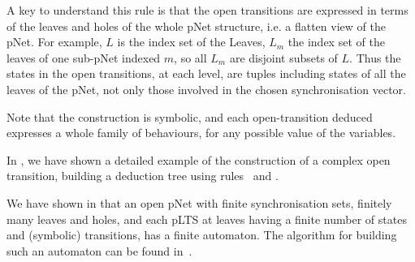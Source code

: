 \documentclass{lmcs}
\newcommand{\TODO}[1]{\textcolor{red}{\textbf{[TODO:#1]}}}
\begin{document}
        	A key to understand this rule is that the open transitions are
	expressed in terms of the leaves and holes of the whole pNet structure,
	i.e. a flatten view of the pNet. For example, $L$ is the index set of the
	Leaves, $L_m$ the index set of the leaves of one sub-pNet indexed $m$, so all $L_m$
	are disjoint subsets of $L$. Thus the states in the open transitions,
	at each level, are tuples including states of all the
	leaves of the pNet, not only those involved in the chosen
	synchronisation vector.


Note that  the construction is symbolic, and each open-transition deduced expresses a whole family of
behaviours, for any possible value of the variables.
%

In \cite{henrio:Forte2016}, we have shown a detailed example of the construction of a complex open transition, building a deduction tree using rules \TrUn ~and \TrDeux.



We have shown in \cite{henrio:Forte2016} that an open pNet
with finite synchronisation sets, finitely many leaves and
holes, and each pLTS at leaves having a finite number of states and
(symbolic) transitions, has a finite automaton. The algorithm for building such an automaton can be found in~\cite{QBMZ-AVOCS18}.



\end{document}
